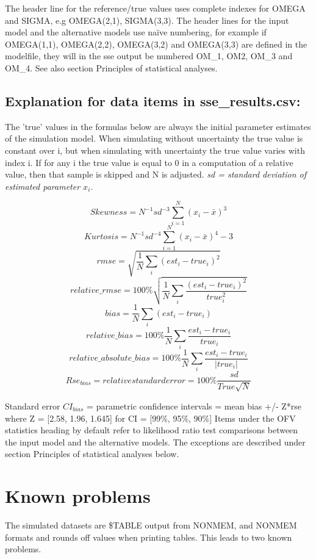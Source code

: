 The header line for the reference/true values uses complete indexes for OMEGA and SIGMA, e.g OMEGA(2,1), SIGMA(3,3). The header lines for the input model and the alternative models use naïve numbering, for example if OMEGA(1,1), OMEGA(2,2), OMEGA(3,2) and OMEGA(3,3) are defined in the modelfile, they will in the sse output be numbered OM\_1, OM2, OM\_3 and OM\_4. See  also section Principles of statistical analyses. 

\subsection{Explanation for data items in sse\_results.csv:}
The 'true' values in the formulas below are always the initial parameter estimates of the simulation model. When simulating without uncertainty the true value is constant over i, but when simulating with uncertainty the true value varies with index i. If for any i the true value is equal to 0 in a computation of a relative value, then that sample is skipped and N is adjusted. 
\emph{sd = standard deviation of estimated parameter $x_i$.}

\[
Skewness = N^{-1} sd^{-3} \sum_{i=1}^N(x_i - \bar{x})^3
\]
\[
Kurtosis = N^{-1} sd^{-4} \sum_{i=1}^N(x_i - \bar{x})^4 - 3
\]
\[
rmse = \sqrt{\frac{1}{N} \sum_i(est_i - true_i)^2}
\]
\[
relative\_rmse = 100\% \sqrt{\frac{1}{N} \sum_i \frac{(est_i - true_i)^2}{true_i^2}}
\]
\[
bias = \frac{1}{N} \sum_i(est_i - true_i)
\]
\[
relative\_bias = 100\% \frac{1}{N} \sum_i \frac{est_i - true_i}{true_i}
\]
\[
relative\_absolute\_bias = 100\% \frac{1}{N} \sum_i \frac{est_i - true_i}{|true_i|}
\]
\[
Rse_{bias} = relativestandarderror = 100\% \frac{sd}{True \sqrt{N}}
\]


Standard error $CI_{bias}$ = parametric confidence intervals = mean bias +/- Z*rse where Z = [2.58, 1.96, 1.645] for CI = [99\%, 95\%, 90\%]
Items under the OFV statistics heading by default refer to likelihood ratio test comparisons between the input model and the alternative models. The exceptions are described under section Principles of statistical analyses below.


\section{Known problems}
The simulated datasets are \$TABLE output from NONMEM, and NONMEM formats and rounds off values when printing tables. This leads to two known problems.

